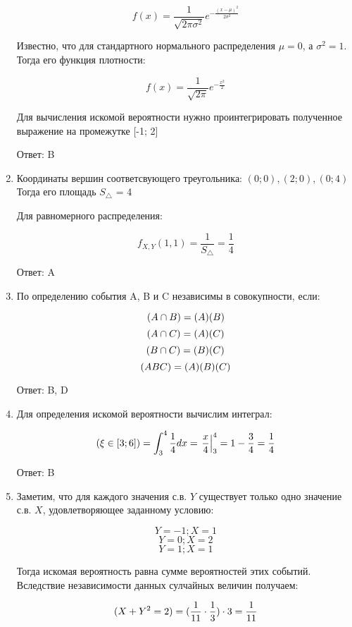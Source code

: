 \documentclass[a4paper]{article} %
\let\P\relax
\DeclareMathOperator{\P}{\mathbb{P}}
\begin{document}
\begin{enumerate}
    \[ f(x)=\frac{1}{\sqrt{2\pi\sigma^2}} e^{-\frac{(x-\mu)^2}{2\sigma^2}} \]
    
    Известно, что для стандартного нормального распределения $\mu=0$, а $\sigma^2=1$. Тогда его функция плотности:
    
    \[ f(x)=\frac{1}{\sqrt{2\pi}} e^{-\frac{x^2}{2}} \]
    
    Для вычисления искомой вероятности нужно проинтегрировать полученное выражение на промежутке [-1; 2]
    
    Ответ: B

    \item

    Координаты вершин соответсвующего треугольника: $(0;0), (2;0), (0;4)$
    Тогда его площадь $S_\triangle$ = 4
   
    Для равномерного распределения:
    
    \[f_{X,Y}(1,1) = \frac{1}{S_\triangle} = \frac{1}{4}\]

    Ответ: A

    \item
    
    По определению события A, B и C независимы в совокупности, если:
    
    \[ \P(A \cap B) = \P(A)\P(B) \]
    \[ \P(A \cap C) = \P(A)\P(C) \]
    \[ \P(B \cap C) = \P(B)\P(C) \]
    \[ \P(ABC) = \P(A)\P(B)\P(C) \]

    Ответ: B, D

    \item
    
    Для определения искомой вероятности вычислим интеграл:
    
    \[\P({\xi\in[3; 6]}) = \int_3^4 \frac{1}{4} dx = \left.\frac{x}{4}\right|_3^4  = 1 - \frac{3}{4} = \frac{1}{4}\]

    Ответ: B

    \item

    Заметим, что для каждого значения с.в. $Y$ существует только одно значение с.в. $X$, удовлетворяющее заданному условию: 
    
    \[Y = -1; X = 1\]
    \[Y = 0; X = 2\]
    \[Y = 1; X = 1\]
    
    Тогда искомая вероятность равна сумме вероятностей этих событий.
    Вследствие независимости данных сулчайных величин получаем:

    \[\P(X + Y^2 = 2) = (\frac{1}{11} \cdot\frac{1}{3}) \cdot 3 = \frac{1}{11}\]


\end{enumerate}
\end{document}
